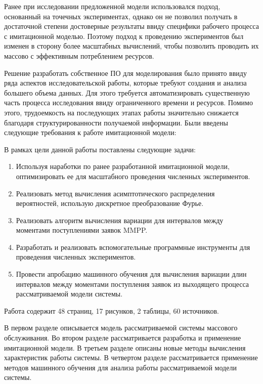 Ранее при исследовании предложенной модели использовался подход, основанный на точечных экспериментах, однако он не позволил получать в достаточной степени достоверные результаты ввиду специфики рабочего процесса с имитационной моделью. Поэтому подход к проведению экспериментов был изменен в сторону более масштабных вычислений, чтобы позволить проводить их массово с эффективным потреблением ресурсов.

Решение разработать собственное ПО для моделирования было принято ввиду ряда аспектов исследовательской работы, которые требуют создания и анализа большего объема данных. Для этого требуется автоматизировать существенную часть процесса исследования ввиду ограниченного времени и ресурсов. Помимо этого, трудоемкость на последующих этапах работы значительно снижается благодаря структурированности получаемой информации.
Были введены следующие требования к работе имитационной модели:

В рамках цели данной работы поставлены следующие задачи:
\begin{enumerate}
	\item Используя наработки по ранее разработанной имитационной модели, оптимизировать ее для масштабного проведения численных экспериментов.
	\item Реализовать метод вычисления асимптотического распределения вероятностей, использую дискретное преобразование Фурье. 
	\item Реализовать алгоритм вычисления вариации для интервалов между моментами поступлениями заявок MMPP.
	\item Разработать и реализовать вспомогательные программные инструменты для проведения численных экспериментов.
	\item Провести апробацию машинного обучения для вычисления вариации длин интервалов между моментами поступления заявок из выходящего процесса рассматриваемой модели системы.
\end{enumerate}

Работа содержит 48 страниц, 17 рисунков, 2 таблицы, 60 источников.

В первом разделе описывается модель рассматриваемой системы массового обслуживания. Во втором разделе рассматривается разработка и применение имитационной модели. В третьем разделе описаны новые методы вычисления характеристик работы системы. В четвертом разделе рассматривается применение методов машинного обучения для анализа работы рассматриваемой модели системы.

 \clearpage
 